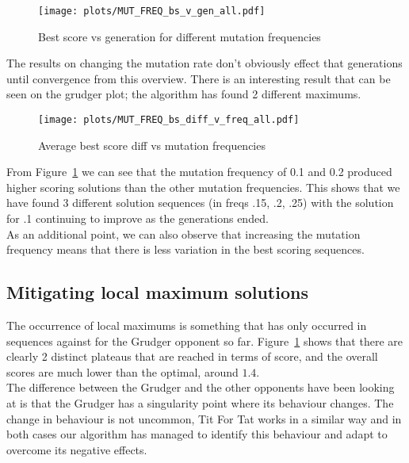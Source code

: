 \begin{figure}[ht] 
\texttt{[image: plots/MUT\_FREQ\_bs\_v\_gen\_all.pdf]}
\caption{Best score vs generation for different mutation frequencies}\label{fig:MUT-FREQ-bs-v-gen-all}
\end{figure}

The results on changing the mutation rate don't obviously effect that generations until convergence from this overview.
There is an interesting result that can be seen on the grudger plot; the algorithm has found 2 different maximums.

\begin{figure}[ht] 
\texttt{[image: plots/MUT\_FREQ\_bs\_diff\_v\_freq\_all.pdf]}
\caption{Average best score diff vs mutation frequencies}\label{fig:MUT-FREQ-bs-diff-v-freq-all}
\end{figure}

From Figure~\ref{fig:MUT-FREQ-bs-v-gen-all} we can see that the mutation frequency of 0.1 and 0.2 produced higher scoring solutions than the other mutation frequencies.
This shows that we have found 3 different solution sequences (in freqs .15, .2, .25) with the solution for .1 continuing to improve as the generations ended.\\

As an additional point, we can also observe that increasing the mutation frequency means that there is less variation in the best scoring sequences.

\subsection{Mitigating local maximum solutions}\label{subsec:mitigatingLocalMaximums}
The occurrence of local maximums is something that has only occurred in sequences against for the Grudger opponent so far.
Figure~\ref{fig:MUT-FREQ-bs-v-gen-all} shows that there are clearly 2 distinct plateaus that are reached in terms of score, and the overall scores are much lower than the optimal, around \(1.4\). \\

The difference between the Grudger and the other opponents have been looking at is that the Grudger has a singularity point where its behaviour changes.
The change in behaviour is not uncommon, Tit For Tat works in a similar way and in both cases our algorithm has managed to identify this behaviour and adapt to overcome its negative effects.\\

